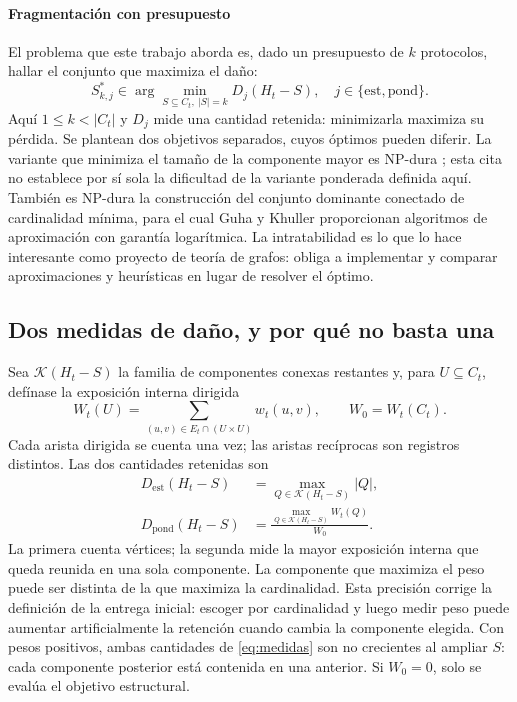 \documentclass[journal]{IEEEtran}
\begin{document}
\paragraph{Fragmentación con presupuesto} El problema que este trabajo aborda es,
dado un presupuesto de $k$ protocolos, hallar el conjunto que maximiza el daño:
\begin{equation}
S^{\ast}_{k,j}\in\arg\min_{S\subseteq C_t,\ |S|=k}D_j(H_t-S),
\quad j\in\{\mathrm{est},\mathrm{pond}\}.
\label{eq:optimo}
\end{equation}
Aquí $1\leq k<|C_t|$ y $D_j$ mide una cantidad retenida: minimizarla maximiza
su pérdida. Se plantean dos objetivos separados, cuyos óptimos pueden diferir.
La variante que minimiza el tamaño de la componente mayor es NP-dura
\cite{shen2012interdiction}; esta cita no establece por sí sola la dificultad
de la variante ponderada definida aquí. También es NP-dura la construcción del conjunto dominante
conectado de cardinalidad mínima, para el cual Guha y Khuller
\cite{guha1998approximation} proporcionan algoritmos de aproximación con garantía
logarítmica. La intratabilidad es lo que lo hace interesante como proyecto de
teoría de grafos: obliga a implementar y comparar aproximaciones y heurísticas en
lugar de resolver el óptimo.

\subsection{Dos medidas de daño, y por qué no basta una}

Sea $\mathcal K(H_t-S)$ la familia de componentes conexas restantes y, para
$U\subseteq C_t$, defínase la exposición interna dirigida
\begin{equation}
W_t(U)=\sum_{(u,v)\in E_t\cap(U\times U)}w_t(u,v),
\qquad W_0=W_t(C_t).
\label{eq:peso-interno}
\end{equation}
Cada arista dirigida se cuenta una vez; las aristas recíprocas son registros
distintos. Las dos cantidades retenidas son
\begin{equation}
\begin{aligned}
D_{\mathrm{est}}(H_t-S)&=\max_{Q\in\mathcal K(H_t-S)}|Q|,\\
D_{\mathrm{pond}}(H_t-S)&=\frac{\max_{Q\in\mathcal K(H_t-S)}W_t(Q)}{W_0}.
\end{aligned}
\label{eq:medidas}
\end{equation}
La primera cuenta vértices; la segunda mide la mayor exposición interna que
queda reunida en una sola componente. La componente que maximiza el peso puede
ser distinta de la que maximiza la cardinalidad. Esta precisión corrige la
definición de la entrega inicial: escoger por cardinalidad y luego medir peso
puede aumentar artificialmente la retención cuando cambia la componente elegida.
Con pesos positivos, ambas cantidades de \eqref{eq:medidas} son no crecientes
al ampliar $S$: cada componente posterior está contenida en una anterior.
Si $W_0=0$, solo se evalúa el objetivo estructural.
\end{document}
